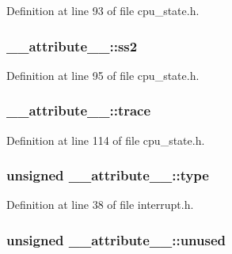 \-Definition at line 93 of file cpu\-\_\-state.\-h.

\hypertarget{struct____attribute_____a2a9a52bb7b54311d2f4d885d629a6193}{
\subsubsection[{ss2}]{ {\bf \-\_\-\-\_\-attribute\-\_\-\-\_\-\-::ss2}}}\label{struct____attribute_____a2a9a52bb7b54311d2f4d885d629a6193}


\-Definition at line 95 of file cpu\-\_\-state.\-h.

\hypertarget{struct____attribute_____a0629c05f38b7fd7ed306b27bd74ce486}{
\subsubsection[{trace}]{ {\bf \-\_\-\-\_\-attribute\-\_\-\-\_\-\-::trace}}}\label{struct____attribute_____a0629c05f38b7fd7ed306b27bd74ce486}


\-Definition at line 114 of file cpu\-\_\-state.\-h.

\hypertarget{struct____attribute_____a47d12bf8d83cf721e816dc5398050f47}{
\subsubsection[{type}]{\setlength{\rightskip}{0pt plus 5cm}unsigned {\bf \-\_\-\-\_\-attribute\-\_\-\-\_\-\-::type}}}\label{struct____attribute_____a47d12bf8d83cf721e816dc5398050f47}


\-Definition at line 38 of file interrupt.\-h.

\hypertarget{struct____attribute_____ae93058176bd21e45993bdc5c5f827803}{
\subsubsection[{unused}]{\setlength{\rightskip}{0pt plus 5cm}unsigned {\bf \-\_\-\-\_\-attribute\-\_\-\-\_\-\-::unused}}}\label{struct____attribute_____ae93058176bd21e45993bdc5c5f827803}


